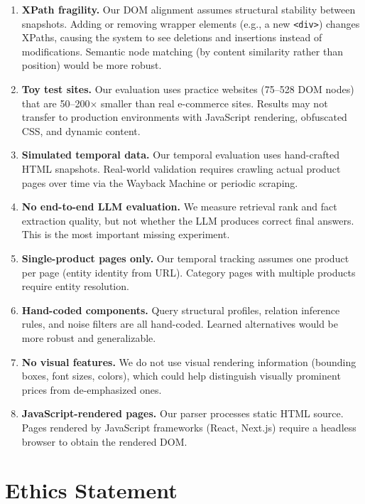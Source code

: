 \documentclass[11pt]{article}
\begin{document}
\begin{enumerate}
    \item \textbf{XPath fragility.} Our DOM alignment assumes structural stability between snapshots. Adding or removing wrapper elements (e.g., a new \texttt{<div>}) changes XPaths, causing the system to see deletions and insertions instead of modifications. Semantic node matching (by content similarity rather than position) would be more robust.

    \item \textbf{Toy test sites.} Our evaluation uses practice websites (75--528 DOM nodes) that are 50--200$\times$ smaller than real e-commerce sites. Results may not transfer to production environments with JavaScript rendering, obfuscated CSS, and dynamic content.

    \item \textbf{Simulated temporal data.} Our temporal evaluation uses hand-crafted HTML snapshots. Real-world validation requires crawling actual product pages over time via the Wayback Machine or periodic scraping.

    \item \textbf{No end-to-end LLM evaluation.} We measure retrieval rank and fact extraction quality, but not whether the LLM produces correct final answers. This is the most important missing experiment.

    \item \textbf{Single-product pages only.} Our temporal tracking assumes one product per page (entity identity from URL). Category pages with multiple products require entity resolution.

    \item \textbf{Hand-coded components.} Query structural profiles, relation inference rules, and noise filters are all hand-coded. Learned alternatives would be more robust and generalizable.

    \item \textbf{No visual features.} We do not use visual rendering information (bounding boxes, font sizes, colors), which could help distinguish visually prominent prices from de-emphasized ones.

    \item \textbf{JavaScript-rendered pages.} Our parser processes static HTML source. Pages rendered by JavaScript frameworks (React, Next.js) require a headless browser to obtain the rendered DOM.
\end{enumerate}

\section{Ethics Statement}
\end{document}
